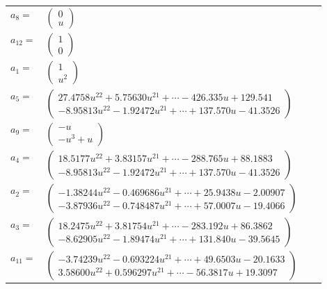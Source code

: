 \documentclass[1p]{elsarticle_modified}
\theoremstyle{definition}
\begin{document}
\begin{tabular}{m{7pt} m{180pt} m{7pt} m{180pt} }
\flushright $a_{8}=$&$\begin{pmatrix}0\\u\end{pmatrix}$ \\
\flushright $a_{12}=$&$\begin{pmatrix}1\\0\end{pmatrix}$ \\
\flushright $a_{1}=$&$\begin{pmatrix}1\\u^2\end{pmatrix}$ \\
\flushright $a_{5}=$&$\begin{pmatrix}27.4758 u^{22}+5.75630 u^{21}+\cdots-426.335 u+129.541\\-8.95813 u^{22}-1.92472 u^{21}+\cdots+137.570 u-41.3526\end{pmatrix}$ \\
\flushright $a_{9}=$&$\begin{pmatrix}- u\\- u^3+u\end{pmatrix}$ \\
\flushright $a_{4}=$&$\begin{pmatrix}18.5177 u^{22}+3.83157 u^{21}+\cdots-288.765 u+88.1883\\-8.95813 u^{22}-1.92472 u^{21}+\cdots+137.570 u-41.3526\end{pmatrix}$ \\
\flushright $a_{2}=$&$\begin{pmatrix}-1.38244 u^{22}-0.469686 u^{21}+\cdots+25.9438 u-2.00907\\-3.87936 u^{22}-0.748487 u^{21}+\cdots+57.0007 u-19.4066\end{pmatrix}$ \\
\flushright $a_{3}=$&$\begin{pmatrix}18.2475 u^{22}+3.81754 u^{21}+\cdots-283.192 u+86.3862\\-8.62905 u^{22}-1.89474 u^{21}+\cdots+131.840 u-39.5645\end{pmatrix}$ \\
\flushright $a_{11}=$&$\begin{pmatrix}-3.74239 u^{22}-0.693224 u^{21}+\cdots+49.6503 u-20.1633\\3.58600 u^{22}+0.596297 u^{21}+\cdots-56.3817 u+19.3097\end{pmatrix}$ \\

\end{tabular}
\end{document}
